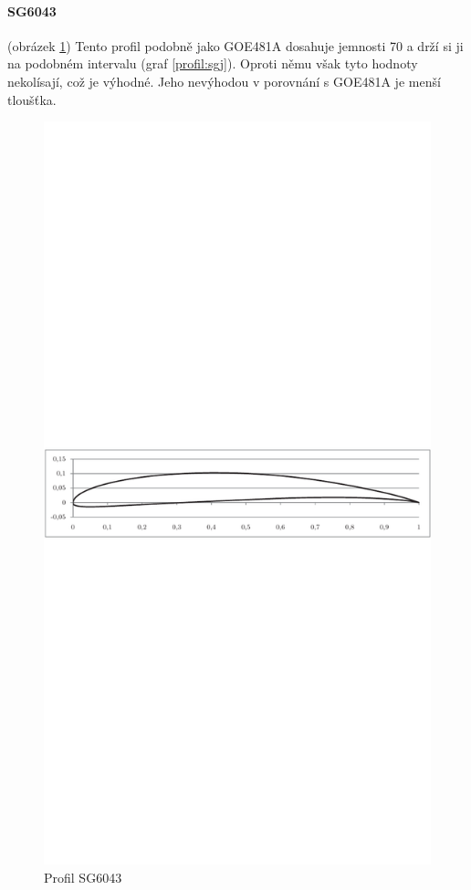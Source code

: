 	\paragraph{SG6043} (obrázek \ref{profil:sg}) Tento profil podobně jako GOE481A dosahuje jemnosti 70 a drží si ji na podobném intervalu (graf \ref{profil:sgj}). Oproti němu však tyto hodnoty nekolísají, což je výhodné. Jeho nevýhodou v porovnání s GOE481A je menší tloušťka.
		\begin{figure}[H]
				\centering
				\includegraphics[]{obrazky/grafy/sgp}
				\caption{Profil SG6043}
				\label{profil:sg}
			\end{figure}
